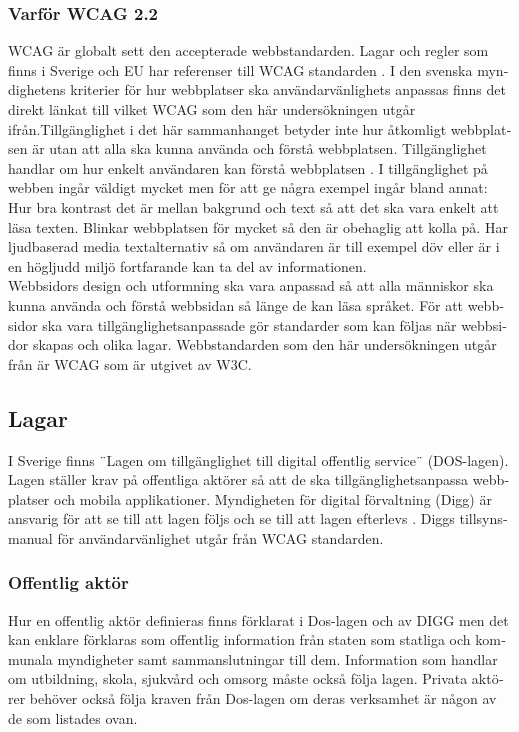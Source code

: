 \documentclass[11p]{article}
\begin{document}
\begin{otherlanguage}{swedish}
    \subsubsection{Varför WCAG 2.2}
    WCAG är globalt sett den accepterade webbstandarden.
    Lagar och regler som finns i Sverige och EU har referenser till WCAG standarden \parencite{Utförande_av_Dos_lagen}.
    I den svenska myndighetens kriterier för hur webbplatser ska användarvänlighets anpassas finns det direkt länkat till vilket WCAG som den här undersökningen utgår ifrån.Tillgänglighet i det här sammanhanget betyder inte hur åtkomligt webbplatsen är utan att alla ska kunna använda och förstå webbplatsen. %
    Tillgänglighet handlar om hur enkelt användaren kan förstå webbplatsen \parencite{webbriktlinjer}.
    I tillgänglighet på webben ingår väldigt mycket men för att ge några exempel ingår bland annat:
    Hur bra kontrast det är mellan bakgrund och text så att det ska vara enkelt att läsa texten.
    Blinkar webbplatsen för mycket så den är obehaglig att kolla på.
    Har ljudbaserad media textalternativ så om användaren är till exempel döv eller är i en högljudd miljö fortfarande kan ta del av informationen.
    \\Webbsidors design och utformning ska vara anpassad så att alla människor ska kunna använda och förstå webbsidan så länge de kan läsa språket.
    För att webbsidor ska vara tillgänglighetsanpassade gör standarder som kan följas när webbsidor skapas och olika lagar.
    Webbstandarden som den här undersökningen utgår från är WCAG som är utgivet av W3C.


    \subsection{Lagar}
    I Sverige finns ¨Lagen om tillgänglighet till digital offentlig service¨ (DOS-lagen)\parencite{Dos-lagen}.
    Lagen ställer krav på offentliga aktörer så att de ska tillgänglighetsanpassa webbplatser och mobila applikationer.
    Myndigheten för digital förvaltning (Digg) är ansvarig för att se till att lagen följs och se till att lagen efterlevs \parencite{Utförande_av_Dos_lagen}.
    Diggs tillsynsmanual för användarvänlighet utgår från WCAG standarden. %

    \subsubsection{Offentlig aktör}
    Hur en offentlig aktör definieras finns förklarat i Dos-lagen \parencite{Dos-lagen} och av DIGG \parencite{Om_Dos-lagen} men det kan enklare förklaras som offentlig information från staten som statliga och kommunala myndigheter samt sammanslutningar till dem.
    Information som handlar om utbildning, skola, sjukvård och omsorg måste också följa lagen.
    Privata aktörer behöver också följa kraven från Dos-lagen om deras verksamhet är någon av de som listades ovan.


\end{otherlanguage}
\end{document}
